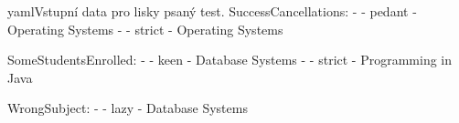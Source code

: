 \documentclass[czech, ma, kiv, he, iso690alph, pdf, viewonly]{fasthesis}
\begin{document}
    \begin{code}{yaml}{Vstupní data pro lisky psaný test. \label{lst:acc:input_data}}
SuccessCancellations:
  -
    - pedant
    - Operating Systems
  -
    - strict
    - Operating Systems

SomeStudentsEnrolled:
  -
    - keen
    - Database Systems
  -
    - strict
    - Programming in Java

WrongSubject:
  -
    - lazy
    - Database Systems\end{code}

\appendix

%
%
%
%
\backmatter
\printbibliography
\listoffigures
\listoftables
\listoflistings
%
%
\setbackpageqrcode
\backpage
\end{document}
